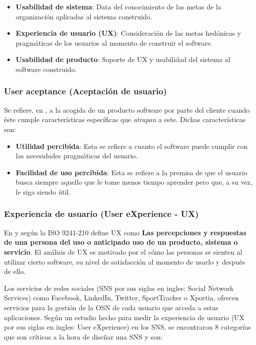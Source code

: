 \begin{itemize}
 \item \textbf{Usabilidad de sistema}: Data del conocimiento de las metas de la organización aplicadas al sistema construido.
\item \textbf{Experiencia de usuario (UX)}: Consideración de las metas hedónicas y pragmáticas de los usuarios al momento de construir el software.
\item \textbf{Usabilidad de producto}: Soporte de UX y usabilidad del sistema al software construido.
\end{itemize}

\subsubsection{User aceptance (Aceptación de usuario)}

Se refiere, en \cite{quality_in_use}, a la acogida de un producto software por parte del cliente cuando éste cumple características específicas que \textit{atrapan} a este. Dichas características son:

\begin{itemize}
 \item \textbf{Utilidad percibida}: Esta se refiere a cuanto el software puede cumplir con las necesidades pragmáticas del usuario.
 \item \textbf{Facilidad de uso percibida}: Esta se refiere a la premisa de que el usuario busca siempre aquello que le tome menos tiempo aprender pero que, a su vez, le siga siendo útil.
\end{itemize}

\subsubsection{Experiencia de usuario (User eXperience - UX)}

En \cite{quality_in_use} y según la ISO 9241-210 define UX como \textbf{Las percepciones y respuestas de una persona del uso o anticipado uso de un producto, sistema o servicio}. El análisis de UX es motivado por el cómo las personas se sienten al utilizar cierto software, su nivel de satisfacción al momento de usarlo y después de ello.

Los servicios de redes sociales (SNS por sus siglas en ingles: Social Network Services) como Facebook, LinkedIn, Twitter, SportTracker o Xportia, ofrecen servicios para la gestión de la OSN de cada usuario que acceda a estas aplicaciones. Según un estudio hecho para medir la experiencia de usuario \cite{user_behavior_online} (UX por sus siglas en ingles: User eXperience) en los SNS, se encontraron 8 categorías que son críticas a la hora de diseñar una SNS y son:

